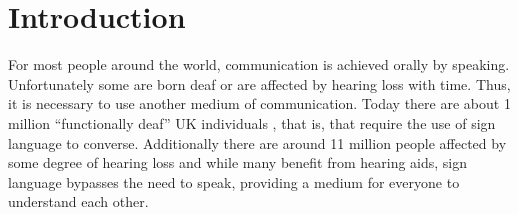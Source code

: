 \documentclass[12pt]{ociamthesis}  %
\begin{document}

\chapter{Introduction}
For most people around the world, communication is achieved orally by speaking. Unfortunately some are born deaf or are affected by hearing loss with time. Thus, it is necessary to use another medium of communication. Today there are about 1 million ``functionally deaf'' UK individuals , that is, that require the use of sign language to converse. Additionally there are around 11 million people affected by some degree of hearing loss and while many benefit from hearing aids, sign language bypasses the need to speak, providing a medium for everyone to understand each other.  
\end{document}
